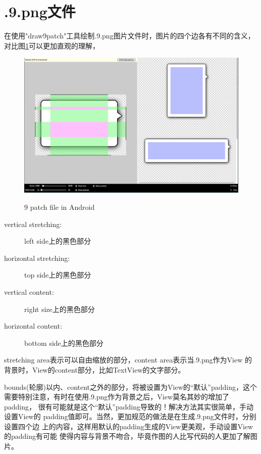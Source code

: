 \section[Nine patch]{.9.png文件}
在使用"draw9patch"工具绘制.9.png图片文件时，图片的四个边各有不同的含义，
对比图\ref{fig:draw9patch}可以更加直观的理解，
\begin{figure}
  \centering
  \includegraphics[width=.8\textwidth]{picturedir/draw9patch.png}\\
  \caption{9 patch file in Android}\label{fig:draw9patch}
\end{figure}

\begin{description}
  \item[vertical stretching: ] left side上的黑色部分
  \item[horizontal stretching: ] top side上的黑色部分
  \item[vertical content: ] right size上的黑色部分
  \item[horizontal content: ] bottom side上的黑色部分
\end{description}
stretching area表示可以自由缩放的部分，content area表示当.9.png作为View
的背景时，View的content部分，比如TextView的文字部分。

bounds(轮廓)以内、content之外的部分，将被设置为View的“默认”padding，这个
需要特别注意，有时在使用.9.png作为背景之后，View莫名其妙的增加了padding，
很有可能就是这个“默认”padding导致的！解决方法其实很简单，手动设置View的
padding值即可。当然，更加规范的做法是在生成.9.png文件时，分别设置四个边
上的内容，这样用默认的padding生成的View更美观，手动设置View的padding有可能
使得内容与背景不吻合，毕竟作图的人比写代码的人更加了解图片。